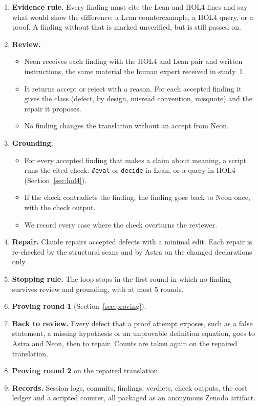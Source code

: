 \documentclass[11pt,a4paper]{article}
\newcommand{\code}[1]{\texttt{#1}}
\begin{document}
\begin{enumerate}
\item \textbf{Evidence rule.} Every finding must cite the Lean and HOL4 lines and say what would show the difference: a Lean counterexample, a HOL4 query, or a proof. A finding without that is marked unverified, but is still passed on.

\item \textbf{Review.}
\begin{itemize}
\item Neon receives each finding with the HOL4 and Lean pair and written instructions, the same material the human expert received in study~1.
\item It returns accept or reject with a reason. For each accepted finding it gives the class (defect, by design, misread convention, misquote) and the repair it proposes.
\item No finding changes the translation without an accept from Neon.
\end{itemize}

\item \textbf{Grounding.}
\begin{itemize}
\item For every accepted finding that makes a claim about meaning, a script runs the cited check: \code{\#eval} or \code{decide} in Lean, or a query in HOL4 (Section~\ref{sec:hol4}).
\item If the check contradicts the finding, the finding goes back to Neon once, with the check output.
\item We record every case where the check overturns the reviewer.
\end{itemize}

\item \textbf{Repair.} Claude repairs accepted defects with a minimal edit. Each repair is re-checked by the structural scans and by Astra on the changed declarations only.

\item \textbf{Stopping rule.} The loop stops in the first round in which no finding survives review and grounding, with at most 5 rounds.

\item \textbf{Proving round 1} (Section~\ref{sec:proving}).

\item \textbf{Back to review.} Every defect that a proof attempt exposes, such as a false statement, a missing hypothesis or an unprovable definition equation, goes to Astra and Neon, then to repair. Counts are taken again on the repaired translation.

\item \textbf{Proving round 2} on the repaired translation.

\item \textbf{Records.} Session logs, commits, findings, verdicts, check outputs, the cost ledger and a scripted counter, all packaged as an anonymous Zenodo artifact.
\end{enumerate}
\end{document}
